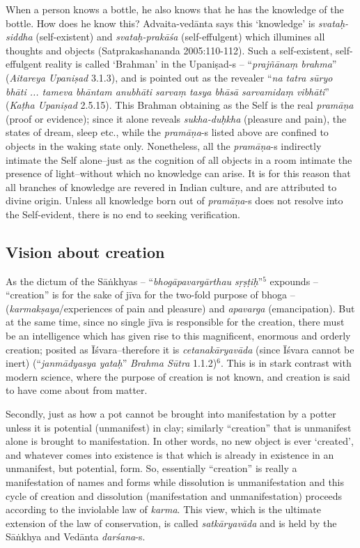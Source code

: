 When a person knows a bottle, he also knows that he has the knowledge of the bottle. How does he know this? Advaita-vedānta says this `knowledge' is {\sl svataḥ-siddha} (self-existent) and {\sl svataḥ-prakāśa} (self-eﬀulgent) which illumines all thoughts and objects (Satprakashananda 2005:110-112). Such a self-existent, self-eﬀulgent reality is called `Brahman' in the Upaniṣad-s -- ``{\sl prajñānaṃ brahma}'' ({\sl Aitareya Upaniṣad} 3.1.3), and is pointed out as the revealer ``{\sl na tatra sūryo bhāti ... tameva bhāntam anubhāti sarvaṃ tasya bhāsā sarvamidaṃ vibhāti}'' ({\sl Kaṭha Upaniṣad} 2.5.15). This Brahman obtaining as the Self is the real {\sl pramāṇa} (proof or evidence); since it alone reveals {\sl sukha-duḥkha} (pleasure and pain), the states of dream, sleep etc., while the {\sl pramāṇa}-s listed above are conﬁned to objects in the waking state only. Nonetheless, all the {\sl pramāṇa}-s indirectly intimate the Self alone--just as the cognition of all objects in a room intimate the presence of light--without which no knowledge can arise. It is for this reason that all branches of knowledge are revered in Indian culture, and are attributed to divine origin. Unless all knowledge born out of {\sl pramāṇa}-s does not resolve into the Self-evident, there is no end to seeking veriﬁcation.

\subsection{Vision about creation}\label{art12-sec2.3}

As the dictum of the Sāṅkhyas -- ``{\sl bhogāpavargārthau sṛṣṭiḥ}''$^{5}$ expounds -- ``creation'' is for the sake of jīva for the two-fold purpose of bhoga -- ({\sl karmakṣaya}/experiences of pain and pleasure) and {\sl apavarga} (emancipation). But at the same time, since no single jīva is responsible for the creation, there must be an intelligence which has given rise to this magniﬁcent, enormous and orderly creation; posited as Īśvara--therefore it is {\sl cetanakāryavāda} (since Īśvara cannot be inert) (``{\sl janmādyasya yataḥ}'' {\sl Brahma Sūtra} 1.1.2)$^{6}$. This is in stark contrast with modern science, where the purpose of creation is not known, and creation is said to have come about from matter. 

Secondly, just as how a pot cannot be brought into manifestation by a potter unless it is potential (unmanifest) in clay; similarly ``creation'' that is unmanifest alone is brought to manifestation. In other words, no new object is ever `created', and whatever comes into existence is that which is already in existence in an unmanifest, but potential, form. So, essentially ``creation'' is really a manifestation of names and forms while dissolution is unmanifestation and this cycle of creation and dissolution (manifestation and unmanifestation) proceeds according to the inviolable law of {\sl karma}. This view, which is the ultimate extension of the law of conservation, is called {\sl satkāryavāda} and is held by the Sāṅkhya and Vedānta {\sl darśana}-s.


